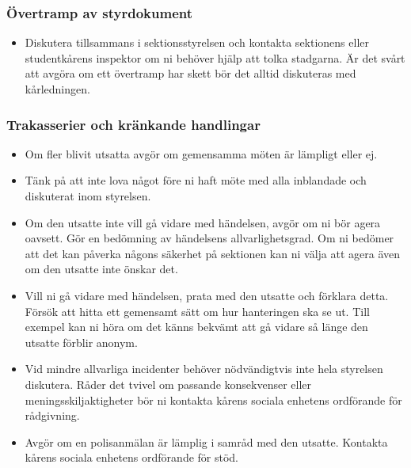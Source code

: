 \subsubsection{Övertramp av styrdokument}
\begin{itemize}
    \item Diskutera tillsammans i sektionsstyrelsen och kontakta sektionens eller studentkårens inspektor om ni behöver hjälp att tolka stadgarna. Är det svårt att avgöra om ett övertramp har skett bör det alltid diskuteras med kårledningen. 
\end{itemize}

\subsubsection{Trakasserier och kränkande handlingar}
\begin{itemize}
    \item Om fler blivit utsatta avgör om gemensamma möten är lämpligt eller ej. 
    \item Tänk på att inte lova något före ni haft möte med alla inblandade och diskuterat inom styrelsen.
    \item Om den utsatte inte vill gå vidare med händelsen, avgör om ni bör agera oavsett. Gör en bedömning av händelsens allvarlighetsgrad. Om ni bedömer att det kan påverka någons säkerhet på sektionen kan ni välja att agera även om den utsatte inte önskar det.
    \item Vill ni gå vidare med händelsen, prata med den utsatte och förklara detta. Försök att hitta ett gemensamt sätt om hur hanteringen ska se ut. Till exempel kan ni höra om det känns bekvämt att gå vidare så länge den utsatte förblir anonym.
    \item Vid mindre allvarliga incidenter behöver nödvändigtvis inte hela styrelsen diskutera. Råder det tvivel om passande konsekvenser eller meningsskiljaktigheter bör ni kontakta kårens sociala enhetens ordförande för rådgivning.
    \item Avgör om en polisanmälan är lämplig i samråd med den utsatte. Kontakta kårens sociala enhetens ordförande för stöd. 
\end{itemize}

